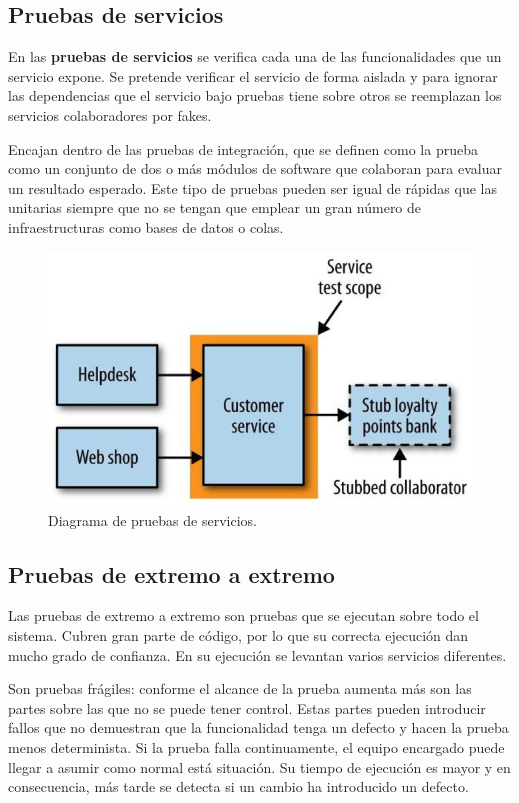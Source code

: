 \documentclass[11pt,spanish,listoffigures,listoftables]{tfgetsinf}
\begin{document}
\subsection{Pruebas de servicios}

En las \textbf{pruebas de servicios} se verifica cada una de las funcionalidades que un servicio expone. Se pretende verificar el servicio de forma aislada y para ignorar las dependencias que el servicio bajo pruebas tiene sobre otros se reemplazan los servicios colaboradores por fakes.

Encajan dentro de las pruebas de integración, que se definen como la prueba como un conjunto de dos o más módulos de software que colaboran para evaluar un resultado esperado. \cite{Osherove2014} Este tipo de pruebas pueden ser igual de rápidas que las unitarias siempre que no se tengan que emplear un gran número de infraestructuras como bases de datos o colas.

\begin{figure}[h]
\centering
\includegraphics[scale=0.5]{Service_Tests}
\caption{Diagrama de pruebas de servicios.}
\end{figure}

\subsection{Pruebas de extremo a extremo}

Las pruebas de extremo a extremo son pruebas que se ejecutan sobre todo el sistema. Cubren gran parte de código, por lo que su correcta ejecución dan mucho grado de confianza. En su ejecución se levantan varios servicios diferentes.

Son pruebas frágiles: conforme el alcance de la prueba aumenta más son las partes sobre las que no se puede tener control. Estas partes pueden introducir fallos que no demuestran que la funcionalidad tenga un defecto y hacen la prueba menos determinista. Si la prueba falla continuamente, el equipo encargado puede llegar a asumir como normal está situación. Su tiempo de ejecución es mayor y en consecuencia, más tarde se detecta si un cambio ha introducido un defecto. \cite{Newman2015a}
\end{document}
